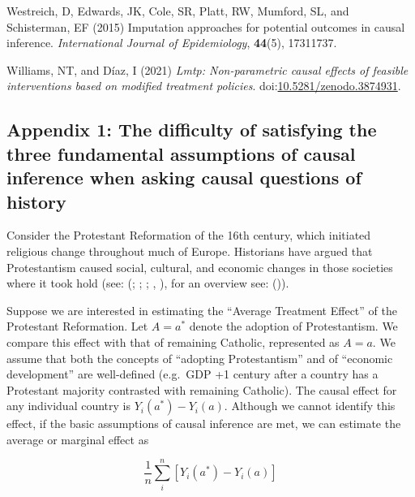\documentclass[
  singlecolumn,
  9pt]{article}
\begin{document}
\begin{CSLReferences}
Westreich, D, Edwards, JK, Cole, SR, Platt, RW, Mumford, SL, and
Schisterman, EF (2015) Imputation approaches for potential outcomes in
causal inference. \emph{International Journal of Epidemiology},
\textbf{44}(5), 17311737.

Williams, NT, and Díaz, I (2021) \emph{Lmtp: Non-parametric causal
effects of feasible interventions based on modified treatment policies}.
doi:\href{https://doi.org/10.5281/zenodo.3874931}{10.5281/zenodo.3874931}.

\end{CSLReferences}

\newpage{}

\subsection{Appendix 1: The difficulty of satisfying the three
fundamental assumptions of causal inference when asking causal questions
of
history}\label{appendix-1-the-difficulty-of-satisfying-the-three-fundamental-assumptions-of-causal-inference-when-asking-causal-questions-of-history}

Consider the Protestant Reformation of the 16th century, which initiated
religious change throughout much of Europe. Historians have argued that
Protestantism caused social, cultural, and economic changes in those
societies where it took hold (see: (; ;
; , ), for an overview see:
()).

Suppose we are interested in estimating the ``Average Treatment Effect''
of the Protestant Reformation. Let \(A = a^*\) denote the adoption of
Protestantism. We compare this effect with that of remaining Catholic,
represented as \(A = a\). We assume that both the concepts of ``adopting
Protestantism'' and of ``economic development'' are well-defined
(e.g.~GDP +1 century after a country has a Protestant majority
contrasted with remaining Catholic). The causal effect for any
individual country is \(Y_i(a^*) - Y_i(a)\). Although we cannot identify
this effect, if the basic assumptions of causal inference are met, we
can estimate the average or marginal effect as

\[
\frac{1}{n} \sum_i^{n} \left[ Y_i(a^*) - Y_i(a) \right]
\]
\end{document}
